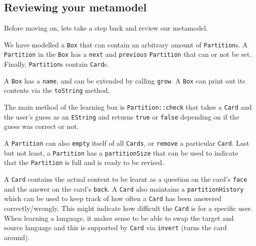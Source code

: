 \newpage
\genHeader
\subsection{Reviewing your metamodel}

\hypertarget{static review}{Before moving on, lets take a step back and review our metamodel.}
We have modelled a \texttt{Box} that can contain an arbitrary amount of \texttt{Partition}s.
A \texttt{Partition} in the \texttt{Box} has a \texttt{next} and \texttt{previous} \texttt{Partition} that can or not be set. Finally, \texttt{Partition}s contain \texttt{Card}s.

A \texttt{Box} has a \texttt{name}, and can be extended by calling \texttt{grow}.
A \texttt{Box} can print out its contents via the \texttt{toString} method.

The main method of the learning box is \texttt{Partition::check} that takes a \texttt{Card} and the user's guess as an \texttt{EString} and returns \texttt{true} or \texttt{false} depending on if the guess was correct or not.

A \texttt{Partition} can also \texttt{empty} itself of all \texttt{Cards}, or \texttt{remove} a particular \texttt{Card}.
Last but not least, a \texttt{Partition} has a \texttt{partitionSize} that can be used to indicate that the \texttt{Partition} is full and is ready to be revised.

A \texttt{Card} contains the actual content to be learnt as a question on the card's \texttt{face} and the answer on the card's \texttt{back}.
A \texttt{Card} also maintains a \texttt{partition\-History} which can be used to keep track of how often a \texttt{Card} has been answered correctly/wrongly.
This might indicate how difficult the \texttt{Card} is for a specific user.
When learning a language, it makes sense to be able to swap the target and source language and this is supported by \texttt{Card} via \texttt{invert} (turns the card around).

